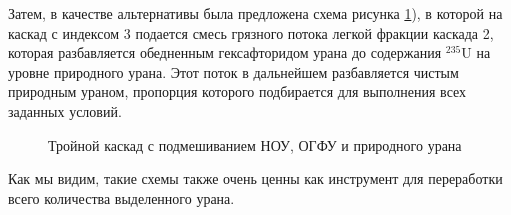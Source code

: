 Затем, в качестве альтернативы была предложена схема рисунка \ref{fig:patent}), в которой на каскад с индексом 3 подается смесь грязного потока легкой фракции каскада 2, которая разбавляется обедненным гексафторидом урана до содержания $^{235}$U на уровне природного урана. Этот поток в дальнейшем разбавляется чистым природным ураном, пропорция которого подбирается для выполнения всех заданных условий.
\begin{figure}[ht]
  \caption{Тройной каскад с подмешиванием НОУ, ОГФУ и природного урана}\label{fig:patent}
\end{figure}

Как мы видим, такие схемы также очень ценны как инструмент для переработки всего количества выделенного урана.




